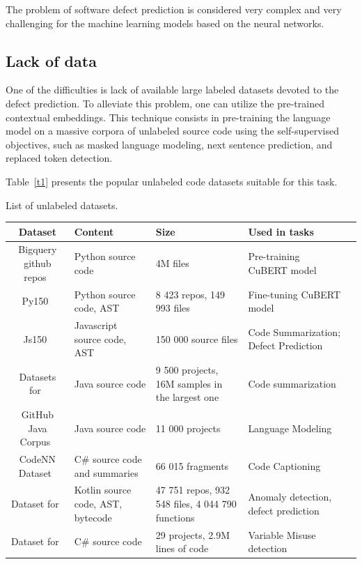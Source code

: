 \documentclass[mathematics,review,submit,moreauthors,pdftex]{Definitions/mdpi}
\begin{document}
The problem of software defect prediction is considered very complex and very challenging for the machine learning models based on the neural networks. 

\subsection{Lack of data}

One of the difficulties is lack of available large labeled datasets devoted to the defect prediction. To alleviate this problem, one can utilize the pre-trained contextual embeddings. This technique consists in pre-training the language model on a massive corpora of unlabeled source code using the self-supervised objectives, such as masked language modeling, next sentence prediction, and replaced token detection. 

Table~\ref{t1} presents the popular unlabeled code datasets suitable for this task.

\begin{specialtable}[H] 
\caption{List of unlabeled datasets.\label{t1}}
\renewcommand{\arraystretch}{2.0}
\begin{tabulary}{.7\textwidth}{CLLLl}
\toprule
\textbf{Dataset}	& \textbf{Content}	& \textbf{Size}  & \parbox{10em}{\textbf{Used in tasks}}\\
\midrule
Bigquery github repos~\cite{kanade20cubert} & Python source code & 4M files & Pre-training CuBERT model \\
Py150~\cite{RaychevEtAl2016Deep3} & Python source code, AST & 8 423 repos, 149 993 files & Fine-tuning CuBERT model \\
Js150~\cite{RaychevEtAl2016} & Javascript source code, AST & 150 000 source files & Code Summarization; Defect Prediction\\
Datasets for~\cite{AlonEtAl2019seq} & Java source code & 9 500 projects, 16M samples in the largest one & Code summarization \\
GitHub Java Corpus~\cite{AllamanisSutton2013} & Java source code & 11 000 projects & Language Modeling \\
CodeNN Dataset~\cite{IyerEtAl2016} & C\# source code and summaries & 66 015 fragments & Code Captioning \\
Dataset for~\cite{BryksinEtAl2020} & Kotlin source code, AST, bytecode & 47 751 repos, 932 548 files, 4 044 790 functions & Anomaly detection, defect prediction \\
Dataset for~\cite{AllamanisBrockschmidtKhademi2018} & C\# source code & 29 projects, 2.9M lines of code & Variable Misuse detection \\
\bottomrule
\end{tabulary}
\end{specialtable}
\end{document}
